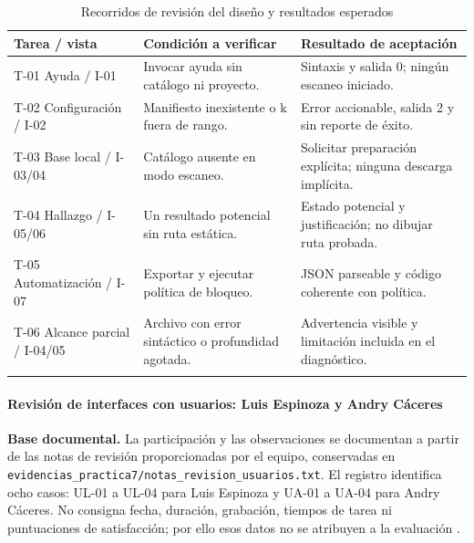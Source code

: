\begin{table}[H]
\centering\small{}
\caption{Recorridos de revisión del diseño y resultados esperados}
\begin{tabularx}{\textwidth}{P{3.6cm}YY}
\toprule
\textbf{Tarea / vista} & \textbf{Condición a verificar} & \textbf{Resultado de aceptación} \\
\midrule
T-01 Ayuda / I-01 & Invocar ayuda sin catálogo ni proyecto. & Sintaxis y salida 0; ningún escaneo iniciado. \\
\addlinespace
T-02 Configuración / I-02 & Manifiesto inexistente o k fuera de rango. & Error accionable, salida 2 y sin reporte de éxito. \\
\addlinespace
T-03 Base local / I-03/04 & Catálogo ausente en modo escaneo. & Solicitar preparación explícita; ninguna descarga implícita. \\
\addlinespace
T-04 Hallazgo / I-05/06 & Un resultado potencial sin ruta estática. & Estado potencial y justificación; no dibujar ruta probada. \\
\addlinespace
T-05 Automatización / I-07 & Exportar y ejecutar política de bloqueo. & JSON parseable y código coherente con política. \\
\addlinespace
T-06 Alcance parcial / I-04/05 & Archivo con error sintáctico o profundidad agotada. & Advertencia visible y limitación incluida en el diagnóstico. \\
\addlinespace
\bottomrule
\end{tabularx}
\end{table}





\paragraph*{Revisión de interfaces con usuarios: Luis Espinoza y Andry Cáceres}
\textbf{Base documental.} La participación y las observaciones se documentan a partir de las notas de revisión proporcionadas por el equipo, conservadas en \texttt{evidencias\_\allowbreak practica7/\allowbreak notas\_\allowbreak revision\_\allowbreak usuarios.\allowbreak txt}. El registro identifica ocho casos: UL-01 a UL-04 para Luis Espinoza y UA-01 a UA-04 para Andry Cáceres. No consigna fecha, duración, grabación, tiempos de tarea ni puntuaciones de satisfacción; por ello esos datos no se atribuyen a la evaluación \parencite{pyreachrevisionusuarios}.

